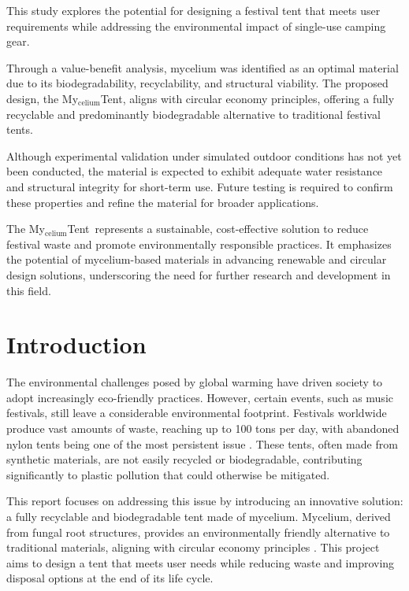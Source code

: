 \documentclass{article}
\newcommand{\myc}{My$_{\text{celium}}$Tent}
\begin{document}
This study explores the potential for designing a festival tent that
meets user requirements while addressing the environmental impact of
single-use camping gear.  

Through a value-benefit analysis, mycelium was identified as an
optimal material due to its biodegradability, recyclability, and
structural viability. The proposed design, the \myc,
aligns with circular economy principles, offering a fully recyclable
and predominantly biodegradable alternative to traditional festival
tents. 

Although experimental validation under simulated outdoor conditions
has not yet been conducted, the material is expected to exhibit
adequate water resistance and structural integrity for short-term use.
Future testing is required to confirm these properties and refine the
material for broader applications. 

The \myc\ represents a sustainable, cost-effective solution to
reduce festival waste and promote environmentally responsible
practices. It emphasizes the potential of mycelium-based materials in
advancing renewable and circular design solutions, underscoring the
need for further research and development in this field.

\newpage
\tableofcontents
\thispagestyle{empty}

\newpage
\section{Introduction}
The environmental challenges posed by global warming have driven society to adopt
increasingly eco-friendly practices. However, certain events, such as music festivals,
still leave a considerable environmental footprint. Festivals worldwide produce vast
amounts of waste, reaching up to 100 tons per day, with abandoned nylon tents being one
of the most persistent issue {\color{red}{(Gray reference??)}}. These tents, often made
from synthetic materials, are not easily recycled or biodegradable, contributing
significantly to plastic pollution that could otherwise be mitigated.

This report focuses on addressing this issue by introducing an innovative solution: a
fully recyclable and biodegradable tent made of mycelium. Mycelium, derived from fungal
root structures, provides an environmentally friendly alternative to traditional materials,
aligning with circular economy principles {\color{red}{(Attias reference??)}}. This project
aims to design a tent that meets user needs while reducing waste and improving disposal
options at the end of its life cycle.
\end{document}
